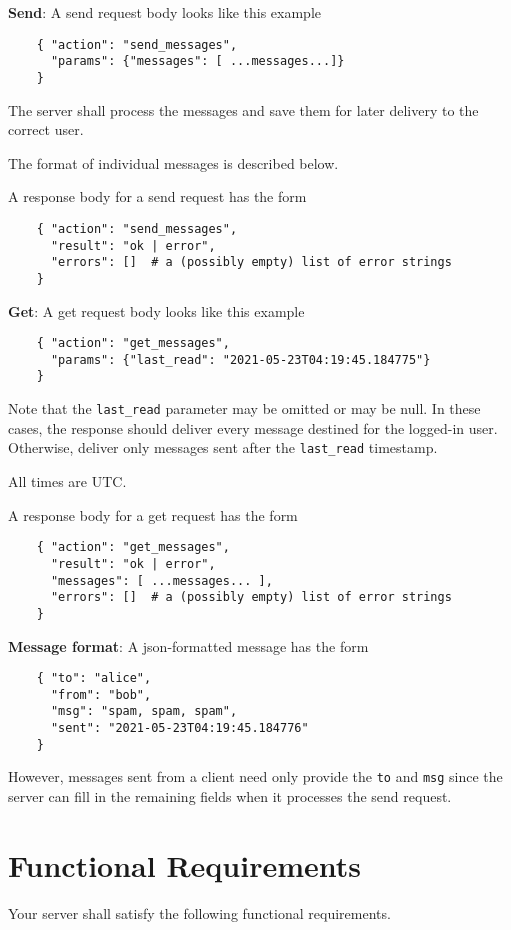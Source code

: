 \documentclass{article}
\begin{document}
\textbf{Send}: A send request body looks like this example
\begin{verbatim}
    { "action": "send_messages",
      "params": {"messages": [ ...messages...]}
    }
\end{verbatim}          
The server shall process the messages and save them for later delivery to 
the correct user.

The format of individual messages is described below.

A response body for a send request has the form
\begin{verbatim}
    { "action": "send_messages",
      "result": "ok | error",
      "errors": []  # a (possibly empty) list of error strings
    } 
\end{verbatim}      

\textbf{Get}: A get request body looks like this example
\begin{verbatim}
    { "action": "get_messages",
      "params": {"last_read": "2021-05-23T04:19:45.184775"}
    }
\end{verbatim}
Note that the \texttt{last\_read} parameter may be omitted or may be null. In 
these cases, the response should deliver every message destined for the logged-in
user. Otherwise, deliver only messages sent after the \texttt{last\_read} timestamp.

All times are UTC.          

A response body for a get request has the form
\begin{verbatim}
    { "action": "get_messages",
      "result": "ok | error",
      "messages": [ ...messages... ],
      "errors": []  # a (possibly empty) list of error strings
    } 
\end{verbatim}  

\textbf{Message format}: A json-formatted message has the form
 \begin{verbatim}
    { "to": "alice",
      "from": "bob",
      "msg": "spam, spam, spam",
      "sent": "2021-05-23T04:19:45.184776"
    }
\end{verbatim}      
 However, messages sent from a client need only provide the \texttt{to} and \texttt{msg} since
 the server can fill in the remaining fields when it processes the send request.
 
\section{Functional Requirements}
Your server shall satisfy the following functional requirements.
\end{document}
